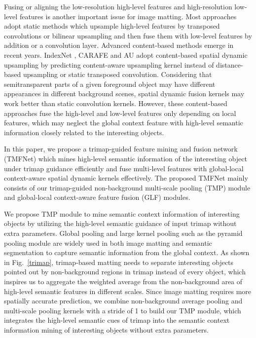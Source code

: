 \documentclass[10pt,twocolumn,letterpaper]{article}
\begin{document}
Fusing or aligning the low-resolution high-level features and high-resolution low-level features is another important issue for image matting. Most approaches \cite{deepmatting,gca,fba,sim}
adopt static methods which upsample high-level features by transposed convolutions or bilinear upsampling and then fuse them with low-level features by addition or a convolution layer.   Advanced content-based methods emerge in recent years.  IndexNet \cite{indexnet}, CARAFE \cite{carafe} and AU \cite{a2u} adopt content-based spatial dynamic upsampling by predicting content-aware upsampling kernel instead of distance-based upsampling or static transposed convolution. Considering that semitransparent parts of a given foreground object may have different appearances in different background scenes, spatial dynamic fusion kernels may work better than  static convolution kernels.  However, these content-based approaches fuse the high-level and low-level features only depending on local features, which may neglect the global context feature with high-level semantic information closely related to the interesting objects.


In this paper, we propose a trimap-guided feature mining and fusion network (TMFNet) which mines high-level semantic information of the interesting object under trimap guidance efficiently and fuse multi-level features with global-local context-aware spatial dynamic kernels effectively. The proposed TMFNet mainly consists of our trimap-guided non-background multi-scale pooling (TMP) module and  global-local context-aware feature fusion (GLF) modules. 

We propose TMP module to mine semantic context information of interesting objects by utilizing the high-level semantic guidance of input trimap without extra parameters. Global pooling and large kernel pooling such as the pyramid pooling module \cite{psp} are widely used in both image matting \cite{fba} and semantic segmentation \cite{upernet}  to capture semantic information from the global context. As shown in Fig.~\ref{trimap}, trimap-based matting needs to separate interesting objects pointed out by non-background regions in trimap  instead of every object, which inspires us to aggregate the weighted average from the non-background area of high-level semantic features in different scales. Since image matting requires more spatially accurate prediction, we combine non-background average pooling and  multi-scale pooling kernels with a stride of 1 to build our TMP module, which integrates the high-level semantic cues of trimap into the semantic context information mining of interesting objects without extra parameters.
\end{document}
